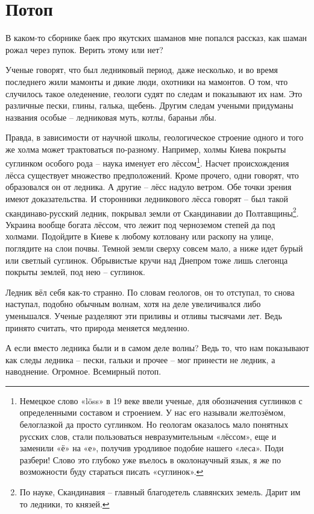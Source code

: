 \chapter{Потоп}

В каком-то сборнике баек про якутских шаманов мне попался рассказ, как шаман рожал через пупок. Верить этому или нет?

Ученые говорят, что был ледниковый период, даже несколько, и во время последнего жили мамонты и дикие люди, охотники на мамонтов. О том, что случилось такое оледенение, геологи судят по следам и показывают их нам. Это различные пески, глины, галька, щебень. Другим следам учеными придуманы названия особые – ледниковая муть, котлы, бараньи лбы.

Правда, в зависимости от научной школы, геологическое строение одного и того же холма может трактоваться по-разному. Например, холмы Киева покрыты суглинком особого рода – наука именует его лёссом\footnote{Немецкое слово «löss» в 19 веке ввели ученые, для обозначения суглинков с определенными составом и строением. У нас его называли желтозёмом, белоглазкой да просто суглинком. Но геологам оказалось мало понятных русских слов, стали пользоваться невразумительным «лёссом», еще и заменили «ё» на «е», получив уродливое подобие нашего «леса». Поди разбери! Слово это глубоко уже въелось в околонаучный язык, я же по возможности буду стараться писать «суглинок».}. Насчет происхождения лёсса существует множество предположений. Кроме прочего, одни говорят, что образовался он от ледника. А другие – лёсс надуло ветром. Обе точки зрения имеют доказательства. И сторонники ледникового лёсса говорят – был такой скандинаво-русский ледник, покрывал земли от Скандинавии до Полтавщины\footnote{По науке, Скандинавия – главный благодетель славянских земель. Дарит им то ледники, то князей.}. Украина вообще богата лёссом, что лежит под черноземом степей да под холмами. Подойдите в Киеве к любому котловану или раскопу на улице, поглядите на слои почвы. Темной земли сверху совсем мало, а ниже идет бурый или светлый суглинок. Обрывистые кручи над Днепром тоже лишь слегонца покрыты землей, под нею – суглинок.

Ледник вёл себя как-то странно. По словам геологов, он то отступал, то снова наступал, подобно обычным волнам, хотя на деле увеличивался либо уменьшался. Ученые разделяют эти приливы и отливы тысячами лет. Ведь принято считать, что природа меняется медленно.

А если вместо ледника были и в самом деле волны? Ведь то, что нам показывают как следы ледника – пески, гальки и прочее – мог принести не ледник, а наводнение. Огромное. Всемирный потоп.

